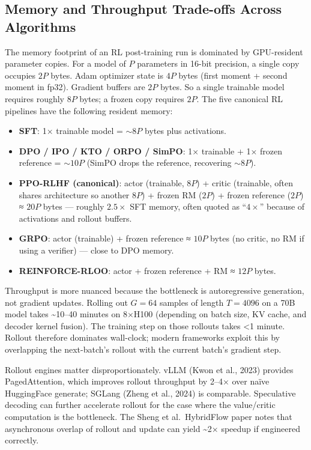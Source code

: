 \subsection{Memory and Throughput Trade-offs Across Algorithms}\label{memory-and-throughput-trade-offs-across-algorithms}

The memory footprint of an RL post-training run is dominated by GPU-resident parameter copies. For a model of \(P\) parameters in 16-bit precision, a single copy occupies \(2P\) bytes. Adam optimizer state is \(4P\) bytes (first moment + second moment in fp32). Gradient buffers are \(2P\) bytes. So a single trainable model requires roughly \(8P\) bytes; a frozen copy requires \(2P\). The five canonical RL pipelines have the following resident memory:

\begin{itemize}
\tightlist
\item
  \textbf{SFT}: 1× trainable model = \(\sim 8P\) bytes plus activations.
\item
  \textbf{DPO / IPO / KTO / ORPO / SimPO}: 1× trainable + 1× frozen reference = \(\sim 10P\) (SimPO drops the reference, recovering \(\sim 8P\)).
\item
  \textbf{PPO-RLHF (canonical)}: actor (trainable, \(8P\)) + critic (trainable, often shares architecture so another \(8P\)) + frozen RM (\(2P\)) + frozen reference (\(2P\)) ≈ \(20P\) bytes --- roughly \(2.5\times\) SFT memory, often quoted as ``\(4\times\)'' because of activations and rollout buffers.
\item
  \textbf{GRPO}: actor (trainable) + frozen reference ≈ \(10P\) bytes (no critic, no RM if using a verifier) --- close to DPO memory.
\item
  \textbf{REINFORCE-RLOO}: actor + frozen reference + RM ≈ \(12P\) bytes.
\end{itemize}

Throughput is more nuanced because the bottleneck is autoregressive generation, not gradient updates. Rolling out \(G = 64\) samples of length \(T = 4096\) on a 70B model takes \textasciitilde10--40 minutes on 8×H100 (depending on batch size, KV cache, and decoder kernel fusion). The training step on those rollouts takes \textless1 minute. Rollout therefore dominates wall-clock; modern frameworks exploit this by overlapping the next-batch's rollout with the current batch's gradient step.

Rollout engines matter disproportionately. vLLM (Kwon et al., 2023) provides PagedAttention, which improves rollout throughput by 2--4× over naïve HuggingFace generate; SGLang (Zheng et al., 2024) is comparable. Speculative decoding can further accelerate rollout for the case where the value/critic computation is the bottleneck. The Sheng et al.~HybridFlow paper notes that asynchronous overlap of rollout and update can yield \textasciitilde2× speedup if engineered correctly.


